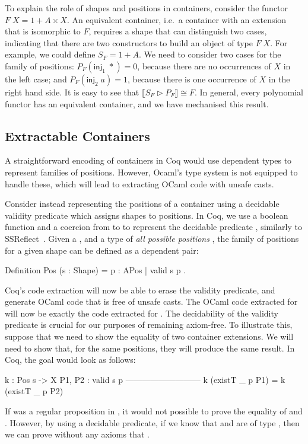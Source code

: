\documentclass{llncs}
\begin{document}
To explain the role of shapes and positions in containers, consider the functor
$F\; X = 1 + A \times X$.  An equivalent container, i.e.\ a container with an
extension that is isomorphic to $F$, requires a shape that can distinguish two
cases, indicating that there are two constructors to build an object of type
$F\;X$. For example, we could define $S_{F} = 1 + A$. We need to consider two
cases for the family of positions:  $P_{F}(\mathsf{inj}_{1}\;*) = 0$, because
there are no occurrences of $X$ in the left case; and
$P_{F}(\mathsf{inj}_{2}\;a) = 1$, because there is one occurrence of $X$ in the
right hand side. It is easy to see that
$\llbracket S_{F} \triangleright P_{F} \rrbracket \cong F$.  In general, every
polynomial functor has an equivalent container, and we have mechanised this
result.
%

\subsection{Extractable Containers}
A straightforward encoding of containers in Coq would use dependent types to
represent families of positions. However, Ocaml's type system is not equipped to
handle these, which will lead to extracting OCaml code with unsafe casts.

Consider instead representing the positions of a container using a decidable
validity predicate which assigns shapes to positions. In Coq, we use
a boolean function and a coercion from  to  to represent
the decidable predicate , similarly to SSReflect~\cite{GonthierL09}. Given
a , and a type of \emph{all possible positions} ,
the family of
positions for a given shape can be defined as a dependent pair:
\begin{coqcode}
Definition Pos (s : Shape) = { p : APos | valid s p }.
\end{coqcode}
Coq's code extraction will now be able to erase the validity predicate, and
generate OCaml code that is free of unsafe casts. The OCaml code extracted for
 will now be exactly the code extracted for .
The decidability of the validity predicate is crucial for our purposes of 
remaining axiom-free. To illustrate this, suppose that we need to show
the equality of two container extensions. We will need to show that, for
the same positions, they will produce the same result. In Coq, the goal
would look as follows: 
\begin{coqcode}
 k : Pos s -> X
 P1, P2 : valid s p
 ---------------------------
 k (existT _ p P1) = k (existT _ p P2)
\end{coqcode}
If  was a regular proposition in , it would not possible
to prove the equality of  and . However, by using a decidable
predicate, if we know that  and  are of type 
, then we can prove without any axioms that 
.
\end{document}
